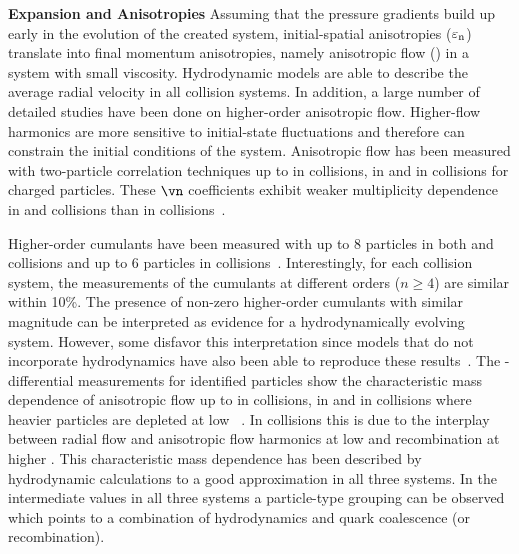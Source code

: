 \documentclass[../report.tex]{subfiles}
\begin{document}
\textbf{Expansion and Anisotropies}
Assuming that the pressure gradients build up early in the evolution of the created system, initial-spatial anisotropies ($\varepsilon_{\rm{n}}$) translate into final momentum anisotropies, namely anisotropic flow (\vn) in a system with small viscosity. Hydrodynamic models are able to describe the average radial velocity in all collision systems. In addition, a large number of detailed studies have been done on higher-order anisotropic flow. Higher-flow harmonics are more sensitive to initial-state fluctuations and therefore can constrain the initial conditions of the system. Anisotropic flow has been measured with two-particle correlation techniques up to \vseven in \PbPb collisions, \vfive in \pPb and \vfour in \pp collisions for charged particles. These $\vn$ coefficients exhibit weaker multiplicity dependence in \pp and \pPb collisions than in \PbPb collisions~\cite{CMS:2012qk,Abelev:2012ola,Aad:2012gla,Aamodt:2011by,Chatrchyan:2011eka,Chatrchyan:2012wg,ATLAS:2012at,Aad:2014lta,Aad:2015gqa,CMS:2015zpa,Khachatryan:2016txc,Acharya:2017ino,Adam:2016ows,Adam:2016nfo,Acharya:2018zuq,Sirunyan:2017uyl,Aaboud:2017acw}.

Higher-order cumulants have been measured with up to 8 particles in both \PbPb and \pPb collisions and up to 6 particles in \pp collisions~\cite{Aad:2013fja,Chatrchyan:2013nka,Khachatryan:2016txc,Aamodt:2010pa,ALICE:2011ab,Chatrchyan:2012ta,Abelev:2014mda,Chatrchyan:2013kba,Aad:2014vba,Khachatryan:2015waa,Adam:2016izf,CMS:2015ica,Sirunyan:2017pan,Sirunyan:2017igb,Aaboud:2017acw,Aaboud:2017blb}. Interestingly, for each collision system, the measurements of the cumulants at different orders ($n \geq 4$) are similar within 10\%. The presence of non-zero higher-order cumulants with similar magnitude can be interpreted as evidence for a hydrodynamically evolving system. However, some disfavor this interpretation since models that do not incorporate hydrodynamics have also been able to reproduce these results~\cite{Sjostrand:2006za,Jia:2014pza,Gyulassy:2014cfa,McLerran:2014uka}. The \pT-differential \vn measurements for identified particles show the characteristic mass dependence of anisotropic flow up to \vfive in \PbPb collisions, \vthree in \pPb and \vtwo in \pp collisions where heavier particles are depleted at low \pT~\cite{Abelev:2014pua,Abelev:2012di,Adam:2016nfo,Khachatryan:2014jra,ABELEV:2013wsa,CMS:2015kua,Khachatryan:2016txc,Acharya:2018zuq}. In \PbPb collisions this is due to the interplay between radial flow and anisotropic flow harmonics at low \pT and recombination at higher \pT. This characteristic mass dependence has been described by hydrodynamic calculations to a good approximation in all three systems. In the intermediate \pT values in all three systems a particle-type grouping can be observed which points to a combination of hydrodynamics and quark coalescence (or recombination).
\end{document}
